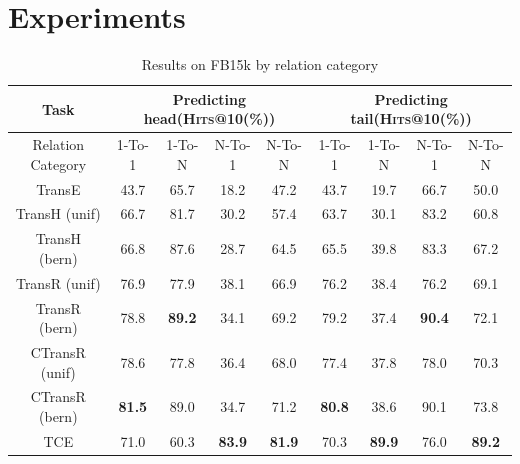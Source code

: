 \section{Experiments}\label{sec:set}

\begin{table} %
  \centering
  \caption{Results on FB15k by relation category}
  \label{table_results_by_relation_category}
  \begin{tabular}{c|cccc|cccc}
    \hline
    Task               & \multicolumn{4}{c|}{Predicting head(\textsc{Hits}@10(\%))} & \multicolumn{4}{c}{Predicting tail(\textsc{Hits}@10(\%))} \\
    \hline
    Relation Category  & 1-To-1        & 1-To-N        & N-To-1        & N-To-N        & 1-To-1        & 1-To-N        & N-To-1        & N-To-N \\
    \hline
    TransE             & 43.7          & 65.7          & 18.2          & 47.2          & 43.7          & 19.7          & 66.7          & 50.0   \\
    TransH (unif)      & 66.7          & 81.7          & 30.2          & 57.4          & 63.7          & 30.1          & 83.2          & 60.8   \\
    TransH (bern)      & 66.8          & 87.6          & 28.7          & 64.5          & 65.5          & 39.8          & 83.3          & 67.2   \\
    TransR (unif)      & 76.9          & 77.9          & 38.1          & 66.9          & 76.2          & 38.4          & 76.2          & 69.1   \\
    TransR (bern)      & 78.8          & \textbf{89.2} & 34.1          & 69.2          & 79.2          & 37.4          & \textbf{90.4} & 72.1   \\
    CTransR (unif)     & 78.6          & 77.8          & 36.4          & 68.0          & 77.4          & 37.8          & 78.0          & 70.3   \\
    CTransR (bern)     & \textbf{81.5} & 89.0          & 34.7          & 71.2          & \textbf{80.8} & 38.6          & 90.1          & 73.8   \\
    \hline
    TCE                & 71.0          & 60.3          & \textbf{83.9} & \textbf{81.9} & 70.3          & \textbf{89.9} & 76.0          & \textbf{89.2}   \\
    \hline
\end{tabular}
\end{table}

